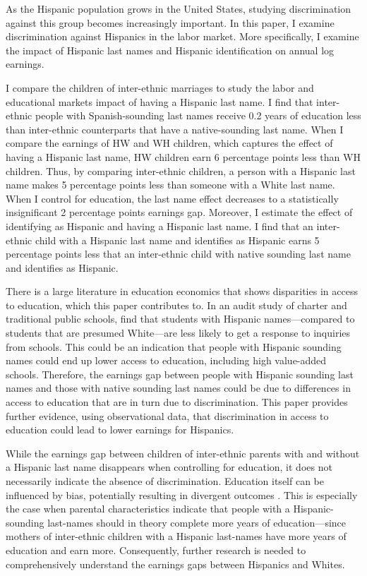 As the Hispanic population grows in the United States, studying discrimination against this group becomes increasingly important. In this paper, I examine discrimination against Hispanics in the labor market. More specifically, I examine the impact of Hispanic last names and Hispanic identification on annual log earnings. 

I compare the children of inter-ethnic marriages to study the labor and educational markets impact of having a Hispanic last name. I find that inter-ethnic people with Spanish-sounding last names receive 0.2 years of education less than inter-ethnic counterparts that have a native-sounding last name. When I compare the earnings of HW and WH children, which captures the effect of having a Hispanic last name, HW children earn  6 percentage points less than WH children. Thus, by comparing inter-ethnic children, a person with a Hispanic last name makes 5 percentage points less than someone with a White last name. When I control for education, the last name effect decreases to a statistically insignificant 2 percentage points earnings gap. Moreover, I estimate the effect of identifying as Hispanic and having a Hispanic last name. I find that an inter-ethnic child with a Hispanic last name and identifies as Hispanic earns 5 percentage points less that an inter-ethnic child with native sounding last name and identifies as Hispanic. 

There is a large literature in education economics that shows disparities in access to education, which this paper contributes to. In an audit study of charter and traditional public schools, \textcite{bergman2018education,gaddis2024racial} find that students with Hispanic names---compared to students that are presumed White---are less likely to get a response to inquiries from schools. This could be an indication that people with Hispanic sounding names could end up lower access to education, including high value-added schools. Therefore, the earnings gap between people with Hispanic sounding last names and those with native sounding last names could be due to differences in access to education that are in turn due to discrimination. This paper provides further evidence, using observational data, that discrimination in access to education could lead to lower earnings for Hispanics. 

While the earnings gap between children of inter-ethnic parents with and without a Hispanic last name disappears when controlling for education, it does not necessarily indicate the absence of discrimination. Education itself can be influenced by bias, potentially resulting in divergent outcomes \autocite{bergman2018education,gaddis2024racial}. This is especially the case when parental characteristics indicate that people with a Hispanic-sounding last-names should in theory complete more years of education---since mothers of inter-ethnic children with a Hispanic last-names have more years of education and earn more. Consequently, further research is needed to comprehensively understand the earnings gaps between Hispanics and Whites.